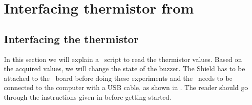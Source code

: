 \section{Interfacing thermistor from \scilab}
\subsection{Interfacing the thermistor}
In this section we will explain a \scilab\ script to read the thermistor
values. Based on the acquired values, we will change
the state of the buzzer.  The Shield has to be attached to the \arduino\ board
before doing these experiments and the \arduino\ needs to be connected to the computer
with a USB cable, as shown in .
The reader should go through the instructions given in
 before getting started.


